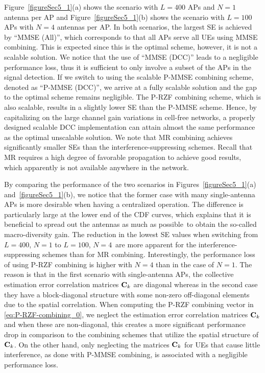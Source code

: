 Figure~\ref{figureSec5_1}(a) shows the scenario with $L=400$ APs and $N=1$ antenna per AP and Figure~\ref{figureSec5_1}(b) shows the scenario with $L=100$ APs with $N=4$ antennas per AP. 
In both scenarios, the largest SE is achieved by ``MMSE (All)'', which corresponds to that all APs serve all UEs using MMSE combining. This is expected since this is the optimal scheme, however, it is not a scalable solution.
We notice that the use of ``MMSE (DCC)'' leads to a negligible performance loss, thus it is sufficient to only involve a subset of the APs in the signal detection. If we switch to using the scalable P-MMSE combining scheme, denoted as ``P-MMSE (DCC)'', we arrive at a fully scalable solution and the gap to the optimal scheme remains negligible. The P-RZF combining scheme, which is also scalable, results in a slightly lower SE than the P-MMSE scheme. Hence, by capitalizing on the large channel gain variations in cell-free networks, a properly designed scalable DCC implementation can attain almost the same performance as the optimal unscalable solution. 
We note that MR combining achieves significantly smaller SEs than the interference-suppressing schemes. Recall that MR requires a high degree of favorable propagation to achieve good results, which apparently is not available anywhere in the network.

\enlargethispage{\baselineskip} 

By comparing the performance of the two scenarios in Figures~\ref{figureSec5_1}(a) and~\ref{figureSec5_1}(b), we notice that the former case with many single-antenna APs is more desirable when having a centralized operation. The difference \linebreak is particularly large at the lower end of the CDF curves, which explains that it is beneficial to spread out the antennas as much as possible~to obtain the so-called macro-diversity gain. The reduction in the lowest SE values when switching from $L=400$, $N=1$ to $L=100$, $N=4$~are more apparent for the interference-suppressing schemes than for MR combining. Interestingly, the performance loss of using P-RZF combining is higher with $N=4$ than in the case of $N=1$. The reason is that in the first scenario with single-antenna APs, the collective estimation error correlation matrices $\mathbf{C}_k$ are diagonal whereas in the second case they have a block-diagonal structure with some non-zero off-diagonal elements due to the spatial correlation. When computing the P-RZF combining vector in  \eqref{eq:P-RZF-combining_0}, we neglect the estimation error correlation matrices $\mathbf{C}_k$ and when these are non-diagonal, this creates a more significant performance drop in comparison to the combining schemes that utilize the spatial structure of $\mathbf{C}_k$. On the other hand, only neglecting the matrices $\mathbf{C}_k$ for UEs that cause little interference, as done with P-MMSE combining, is associated with a negligible performance loss. 

